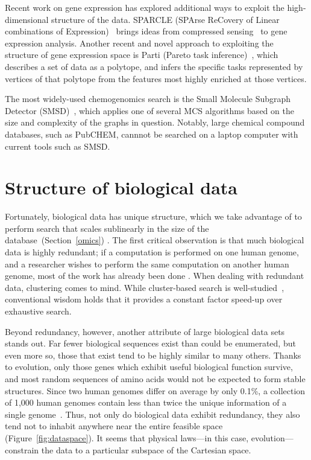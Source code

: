 \documentclass{acm_proc_article-sp}
\begin{document}
Recent work on gene expression has explored additional ways to exploit the high-dimensional 
structure of the data.
SPARCLE (SPArse ReCovery of Linear combinations of Expression)~\cite{prat2011recovering}
brings ideas from compressed sensing~\cite{candes2005decoding} 
to gene expression analysis.
Another recent and novel approach to exploiting the structure of gene expression
space is Parti (Pareto task inference)~\cite{hart2015inferring}, which describes a set of
data as a polytope, and infers the specific tasks represented by vertices of
that polytope from the features most highly enriched at those vertices.

The most widely-used chemogenomics search is the Small Molecule Subgraph Detector 
(SMSD)~\cite{rahman2009small}, which applies one of several MCS algorithms based
on the size and complexity of the graphs in question.
Notably, large chemical compound databases, such as PubCHEM,
cannnot be searched on a laptop computer with current tools such as SMSD.


\section{Structure of biological data}\label{structure}

Fortunately, biological data has unique structure, which we 
take advantage of to perform search that scales sublinearly in the size of the database~(Section~\ref{omics}) \cite{yu2015entropy}.
The first critical observation is that
much biological data is highly redundant; if a computation is performed on one
human genome, and a researcher wishes to perform the same computation on another
human genome, most of the work has already been done \cite{loh2012compressive}.
When dealing with redundant data, clustering comes to mind.
While cluster-based search is well-studied~\cite{jardine1971use}, conventional
wisdom holds that it provides a constant factor speed-up over exhaustive search.

Beyond redundancy, however, another attribute of large biological data sets
stands out.
Far fewer biological sequences exist than could be enumerated, but even more so, those that exist tend to be highly similar to many others.
Thanks to 
evolution, only those genes
which exhibit useful biological function survive, and most
random sequences of amino acids would not be expected to form stable structures.
Since two human genomes differ on average by only 0.1\%, a collection of 1,000 human genomes contain less than twice the unique information of a single genome~\cite{loh2012compressive}.
Thus, not only do biological data exhibit redundancy, they also tend not to 
inhabit anywhere near the entire feasible space (Figure~\ref{fig:dataspace}).
It seems that physical laws---in this case, evolution---constrain the data to a particular subspace of the Cartesian space.
\end{document}
